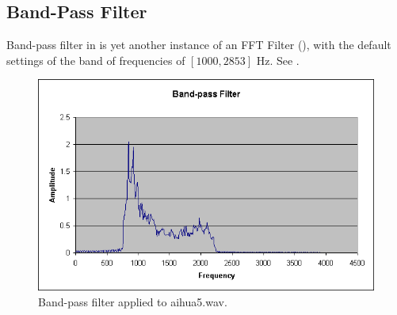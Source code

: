 \subsection{Band-Pass Filter}

Band-pass filter in {\marf} is yet another instance of an FFT Filter (),
with the default settings of the band of frequencies of $[1000, 2853]$ Hz. See .

\begin{figure}
	\centering
	\includegraphics[width=400pt]{../graphics/graphs/band-pass-filter.png}
	\caption{Band-pass filter applied to aihua5.wav.}
	\label{fig:band-pass}
\end{figure}
